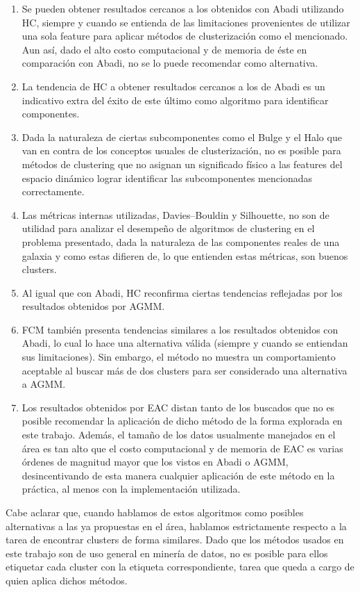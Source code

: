 \begin{enumerate}
\item Se pueden obtener resultados cercanos a los obtenidos con Abadi utilizando \gls{HC}, siempre y cuando se entienda de las limitaciones provenientes de utilizar una sola feature para aplicar métodos de clusterización como el mencionado. Aun así, dado el alto costo computacional y de memoria de éste en comparación con Abadi, no se lo puede recomendar como alternativa.
\item La tendencia de \gls{HC} a obtener resultados cercanos a los de Abadi es un indicativo extra del éxito de este último como algoritmo para identificar componentes.
\item Dada la naturaleza de ciertas subcomponentes como el Bulge y el Halo que van en contra de los conceptos usuales de clusterización, no es posible para métodos de clustering que no asignan un significado físico a las features del espacio dinámico lograr identificar las subcomponentes mencionadas correctamente.
\item Las métricas internas utilizadas, Davies–Bouldin y Silhouette, no son de utilidad para analizar el desempeño de algoritmos de clustering en el problema presentado, dada la naturaleza de las componentes reales de una galaxia y como estas difieren de, lo que entienden estas métricas, son buenos clusters.
\item Al igual que con Abadi, \gls{HC} reconfirma ciertas tendencias reflejadas por los resultados obtenidos por \gls{AGMM}.
\item \gls{FCM} también presenta tendencias similares a los resultados obtenidos con Abadi, lo cual lo hace una alternativa válida (siempre y cuando se entiendan sus limitaciones). Sin embargo, el método no muestra un comportamiento aceptable al buscar más de dos clusters para ser considerado una alternativa a \gls{AGMM}.
\item Los resultados obtenidos por \gls{EAC} distan tanto de los buscados que no es posible recomendar la aplicación de dicho método de la forma explorada en este trabajo. Además, el tamaño de los datos usualmente manejados en el área es tan alto que el costo computacional y de memoria de \gls{EAC} es varias órdenes de magnitud mayor que los vistos en Abadi o \gls{AGMM}, desincentivando de esta manera cualquier aplicación de este método en la práctica, al menos con la implementación utilizada.
\end{enumerate}

Cabe aclarar que, cuando hablamos de estos algoritmos como posibles alternativas a las ya propuestas en el área, hablamos estrictamente respecto a la tarea de encontrar clusters de forma similares. Dado que los métodos usados en este trabajo son de uso general en minería de datos, no es posible para ellos etiquetar cada cluster con la etiqueta correspondiente, tarea que queda a cargo de quien aplica dichos métodos.

